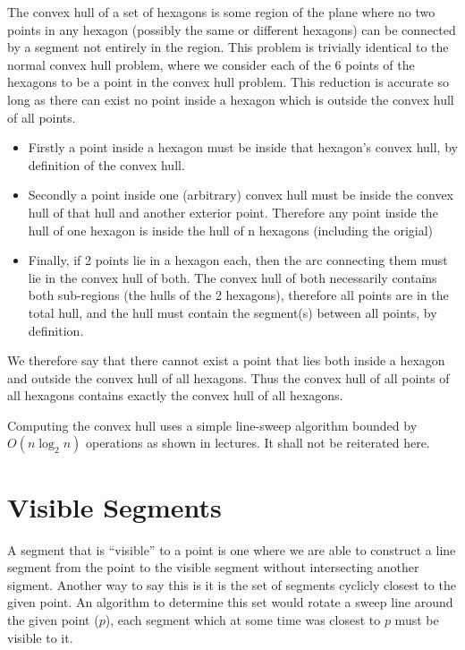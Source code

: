 The convex hull of a set of hexagons is some region of the plane where no two points in any hexagon (possibly the same or different hexagons) can be connected by a segment not entirely in the region.
This problem is trivially identical to the normal convex hull problem, where we consider each of the 6 points of the hexagons to be a point in the convex hull problem.
This reduction is accurate so long as there can exist no point inside a hexagon which is outside the convex hull of all points.
\begin{itemize}
	\item Firstly a point inside a hexagon must be inside that hexagon's convex hull, by definition of the convex hull.
	\item Secondly a point inside one (arbitrary) convex hull must be inside the convex hull of that hull and another exterior point.  Therefore any point inside the hull of one hexagon is inside the hull of n hexagons (including the origial)
	\item Finally, if 2 points lie in a hexagon each, then the arc connecting them must lie in the convex hull of both.  The convex hull of both necessarily contains both sub-regions (the hulls of the 2 hexagons), therefore all points are in the total hull, and the hull must contain the segment(s) between all points, by definition.
\end{itemize}
We therefore say that there cannot exist a point that lies both inside a hexagon and outside the convex hull of all hexagons.
Thus the convex hull of all points of all hexagons contains exactly the convex hull of all hexagons.

Computing the convex hull uses a simple line-sweep algorithm bounded by $O(n \log_{2} n)$ operations as shown in lectures.
It shall not be reiterated here.

\section {Visible Segments}

A segment that is ``visible'' to a point is one where we are able to construct a line segment from the point to the visible segment without intersecting another sigment.
Another way to say this is it is the set of segments cyclicly closest to the given point.
An algorithm to determine this set would rotate a sweep line around the given point ($p$), each segment which at some time was closest to $p$ must be visible to it.

